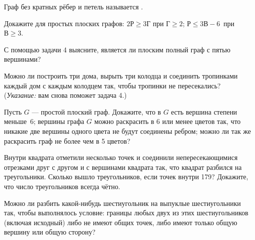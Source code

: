 \documentclass[12pt,a4paper]{article}
\begin{document}
Граф без кратных рёбер и петель называется .

Докажите для простых плоских графов:
 $2Р\geq3Г$ при $Г\geq2$;
 $Р\leq3В-6$~при~$В\geq3$.



С помощью задачи 4 выясните, является ли плоским полный граф с пятью вершинами?

Можно ли построить три дома, вырыть три колодца и соединить тропинками каждый
дом с каждым колодцем так, чтобы тропинки не пересекались? ({\em Указание:} вам снова поможет задача 4.)


Пусть $G$ --- простой плоский граф. Докажите, что
в $G$ есть вершина степени меньше~6;
 вершины графа $G$ можно %
раскрасить
в 6 или менее цветов так, что никакие две вершины одного цвета
не будут соединены ребром;
 можно ли так же раскрасить граф не более чем в 5 цветов?



Внутри квадрата отметили несколько точек и соединили непересекающимися отрезками друг с другом и с вершинами квадрата так, что квадрат разбился на треугольники.
 Сколько вышло треугольников, если точек внутри 179?
 Докажите, что число треугольников всегда чётно.

Можно ли разбить какой-нибудь шестиугольник на выпуклые шестиугольники
так, чтобы выполнялось условие: границы любых двух из этих шестиугольников
(включая исходный) либо не имеют общих точек,
либо имеют только общую вершину или общую сторону?

\end{document}
